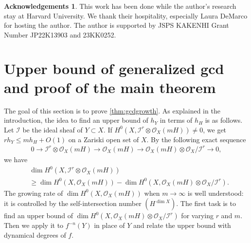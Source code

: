 \documentclass[12pt]{amsart}
\theoremstyle{plain}
\theoremstyle{definition}
\newtheorem*{acknowledgements}{Acknowledgements}
\numberwithin{equation}{section}
\def\O{{ \mathcal{O}}}
\def\I{{ \mathcal{I}}}
\begin{document}
\begin{acknowledgements}
This work has been done while the author's research stay at Harvard University.
We thank their hospitality, especially Laura DeMarco for hosting the author.
The author is supported by JSPS KAKENHI Grant Number JP22K13903 and 23KK0252.
\end{acknowledgements}








\section{Upper bound of generalized gcd and proof of the main theorem}



The goal of this section is to prove \cref{thm:gcdgrowth}.
As explained in the introduction, the idea to find an upper bound of $h_{Y}$ in terms of $h_{H}$
is as follows. Let $\I$ be the ideal sheaf of $Y \subset X$.
If $H^{0}(X, \I^{r} \otimes \O_{X}(m H) ) \neq 0$, we get $r h_{Y} \leq mh_{H} + O(1)$ on a Zariski open set of $X$.
By the following exact sequence 
\begin{align}
0 \longrightarrow \I^{r} \otimes \O_{X}(m H) \longrightarrow \O_{X}(mH) \longrightarrow \O_{X}(mH) \otimes \O_{X} / \I^{r} \longrightarrow 0,
\end{align}
we have
\begin{align}
&\dim H^{0}(X, \I^{r} \otimes \O_{X}(m H) ) \\
&\geq \dim H^{0}(X, \O_{X}(mH)) - \dim H^{0}(X, \O_{X}(mH) \otimes \O_{X} / \I^{r}).
\end{align}
The growing rate of $\dim H^{0}(X, \O_{X}(mH))$ when $m \to \infty$ is well understood: 
it is controlled by the self-intersection number $(H^{\dim X})$.
The first task is to find an upper bound of $\dim H^{0}(X, \O_{X}(mH) \otimes \O_{X} / \I^{r})$ for varying $r$ and $m$.
Then we apply it to $f^{-n}(Y)$ in place of $Y$ and relate the upper bound with dynamical degrees of $f$.

\vspace{1.5em}
\end{document}
